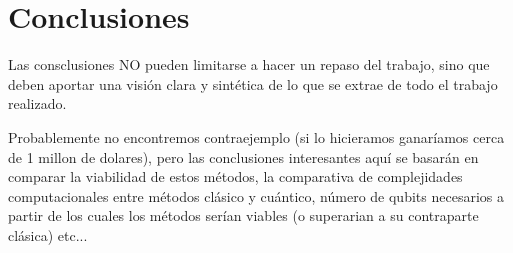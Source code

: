 \chapter{Conclusiones}

Las consclusiones NO pueden limitarse a hacer un repaso del trabajo, sino que deben aportar una visión clara y sintética de lo que se extrae de todo el trabajo realizado.

Probablemente no encontremos contraejemplo (si lo hicieramos ganaríamos cerca de 1 millon de dolares), pero las conclusiones interesantes aquí se basarán en comparar la viabilidad de estos métodos, la comparativa de complejidades computacionales entre métodos clásico y cuántico, número de qubits necesarios a partir de los cuales los métodos serían viables (o superarian a su contraparte clásica) etc...